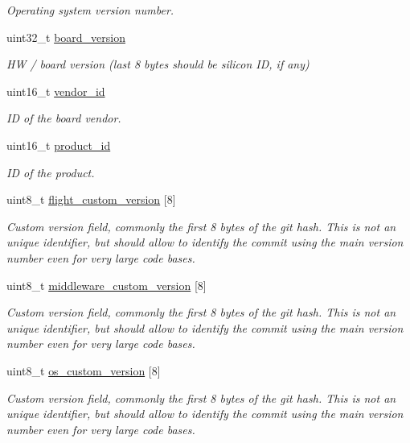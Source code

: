 \begin{DoxyCompactItemize}
\begin{DoxyCompactList}\small\item\em Operating system version number. \end{DoxyCompactList}\item 
uint32\+\_\+t \hyperlink{struct____mavlink__autopilot__version__t_aa94e68859adae94fa27c66e437e33c57}{board\+\_\+version}
\begin{DoxyCompactList}\small\item\em H\+W / board version (last 8 bytes should be silicon I\+D, if any) \end{DoxyCompactList}\item 
uint16\+\_\+t \hyperlink{struct____mavlink__autopilot__version__t_aefea6df48be4162c0e2f7293a7a476c3}{vendor\+\_\+id}
\begin{DoxyCompactList}\small\item\em I\+D of the board vendor. \end{DoxyCompactList}\item 
uint16\+\_\+t \hyperlink{struct____mavlink__autopilot__version__t_a7804efd34f81fc1b0946612a418a924b}{product\+\_\+id}
\begin{DoxyCompactList}\small\item\em I\+D of the product. \end{DoxyCompactList}\item 
uint8\+\_\+t \hyperlink{struct____mavlink__autopilot__version__t_adbbff1b8dad6961b08fe54b3a56fc35f}{flight\+\_\+custom\+\_\+version} \mbox{[}8\mbox{]}
\begin{DoxyCompactList}\small\item\em Custom version field, commonly the first 8 bytes of the git hash. This is not an unique identifier, but should allow to identify the commit using the main version number even for very large code bases. \end{DoxyCompactList}\item 
uint8\+\_\+t \hyperlink{struct____mavlink__autopilot__version__t_a2976ac188326bfcc489713bd00845848}{middleware\+\_\+custom\+\_\+version} \mbox{[}8\mbox{]}
\begin{DoxyCompactList}\small\item\em Custom version field, commonly the first 8 bytes of the git hash. This is not an unique identifier, but should allow to identify the commit using the main version number even for very large code bases. \end{DoxyCompactList}\item 
uint8\+\_\+t \hyperlink{struct____mavlink__autopilot__version__t_a4fcb5af0d12a8ea812dc34e53398638b}{os\+\_\+custom\+\_\+version} \mbox{[}8\mbox{]}
\begin{DoxyCompactList}\small\item\em Custom version field, commonly the first 8 bytes of the git hash. This is not an unique identifier, but should allow to identify the commit using the main version number even for very large code bases. \end{DoxyCompactList}\end{DoxyCompactItemize}


